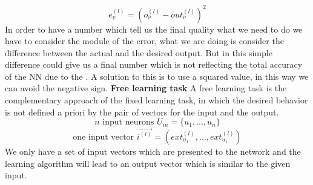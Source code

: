 \documentclass{article}
\begin{document}
$$e_v^{(l)}=\left(o_v^{(l)}-out_v^{(l)}\right)^2$$
In order to have a number which tell us the final quality what we need to do we have
to consider the module of the error, what we are doing is consider the difference between
the actual and the desired output. But in this simple difference could give us a final
number which is not reflecting the total accuracy of the NN due to the .
\newline\newline
A solution to this is to use a squared value, in this way we can avoid the negative
sign.
\newline\newline\noindent\textbf{Free learning task}\newline
A free learning task is the complementary approach of the fixed learning task, in
which the desired behavior is not defined a priori by the pair of vectors for
the input and the output.
$$n\text{ input neurons }U_{in}=\{u_1,...,u_n\}$$
$$\text{one input vector }\vec{i^{(l)}} = \left( ext_{u_1}^{(l)},...,ext_{u_1}^{(l)}\right)$$
We only have a set of input vectors which are presented to the network and the
learning algorithm will lead to an output vector which is similar to the given input.
\end{document}
